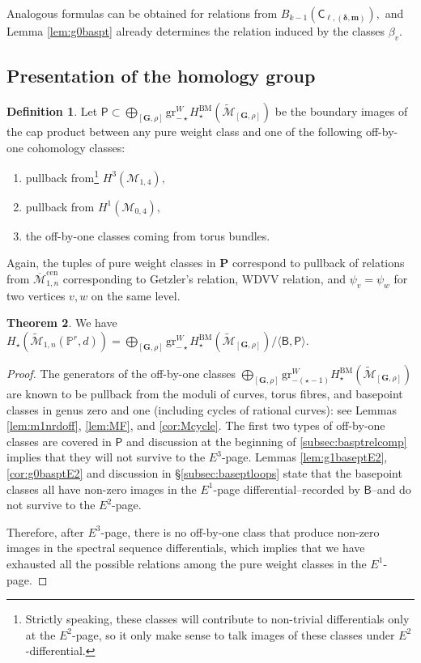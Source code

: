 \documentclass[12pt,reqno]{amsart}
\theoremstyle{definition}
\theoremstyle{definition}
\theoremstyle{definition}
\theoremstyle{definition}
\newtheorem{theorem}{Theorem}[section]
\newtheorem{definition}[theorem]{Definition}
\newcommand{\ol}[1]{\overline{#1}}
\newcommand{\PP}{\mathbb{P}}
\newcommand{\Mcal}{\mathcal{M}}
\newcommand{\Mbar}{\ol{\Mcal}}
\newcommand{\Mtil}{\widetilde{\mathcal{M}}}
\newcommand{\gr}{\mathrm{gr}}
\begin{document}
Analogous formulas can be obtained for relations from $B_{k-1}(\mathsf{C}_{\ell,(\boldsymbol{\delta},\boldsymbol{m})}),$ and Lemma \ref{lem:g0baspt} already determines the relation induced by the classes $\beta_v.$

\subsection{Presentation of the homology group}\label{subsec:pres}

\begin{definition}
  Let $\boldsymbol{\mathsf{P}}\subset \bigoplus_{[\mathbf{G},\rho]}\gr^W_{-\star}H_{\star}^{\mathrm{BM}}(\Mtil_{[\mathbf{G},\rho]})$ be the boundary images of the cap product between any pure weight class and one of the following off-by-one cohomology classes:
  \begin{enumerate}
    \item pullback from\footnote{Strictly speaking, these classes will contribute to non-trivial differentials only at the $E^2$-page, so it only make sense to talk images of these classes under $E^2$-differential.} $H^3(\mathcal{M}_{1,4}),$
    \item pullback from $H^1(\mathcal{M}_{0,4}),$
    \item the off-by-one classes coming from torus bundles.
  \end{enumerate}
\end{definition}
Again, the tuples of pure weight classes in $\mathbf{P}$ correspond to pullback of relations from $\Mbar_{1,n}^{\mathrm{cen}}$ corresponding to Getzler's relation, WDVV relation, and $\psi_v = \psi_w$ for two vertices $v,w$ on the same level.

\begin{theorem}\label{thm:relations}
  We have $H_{\star}(\Mtil_{1,n}(\PP^r,d)) = \bigoplus_{[\mathbf{G},\rho]}\gr^W_{-\star}H^{\mathrm{BM}}_{\star}(\Mtil_{[\mathbf{G},\rho]})/\langle \boldsymbol{\mathsf{B}}, \boldsymbol{\mathsf{P}} \rangle.$
\end{theorem}
\begin{proof}
  The generators of the off-by-one classes $\bigoplus_{[\mathbf{G},\rho]}\mathrm{gr}^W_{-(\star-1)}H_{\star}^{\mathrm{BM}}(\Mtil_{[\mathbf{G},\rho]})$ are known to be pullback from the moduli of curves, torus fibres, and basepoint classes in genus zero and one (including cycles of rational curves): see Lemmas \ref{lem:m1nrdoff}, \ref{lem:MF}, and \ref{cor:Mcycle}. The first two types of off-by-one classes are covered in $\boldsymbol{\mathsf{P}}$ and discussion at the beginning of \ref{subsec:basptrelcomp} implies that they will not survive to the $E^3$-page. Lemmas \ref{lem:g1baseptE2}, \ref{cor:g0basptE2} and discussion in §\ref{subsec:baseptloops} state that the basepoint classes all have non-zero images in the $E^1$-page differential--recorded by $\boldsymbol{\mathsf{B}}$--and do not survive to the $E^2$-page. 
  
  Therefore, after $E^3$-page, there is no off-by-one class that produce non-zero images in the spectral sequence differentials, which implies that we have exhausted all the possible relations among the pure weight classes in the $E^1$-page.
\end{proof}
\end{document}
